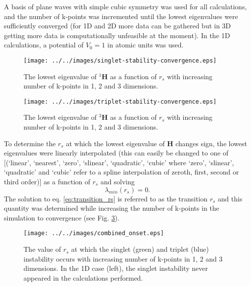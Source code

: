\documentclass[preprint, journal=prl]{revtex4-1}
\begin{document}
  A basis of plane waves with simple cubic symmetry was used for all calculations, and the number of k-points was incremented until the lowest eigenvalues were sufficiently converged {\color{red} (for 1D and 2D more data can be gathered but in 3D getting more data is computationally unfeasible at the moment)}. In the 1D calculations, a potential of $V_0 = 1$ in atomic units was used.
  \begin{figure}[H]
    \centering
    \texttt{[image: ../../images/singlet-stability-convergence.eps]}
    \caption{The lowest eigenvalue of ${}^1\mathbf{H}$ as a function of $r_s$ with increasing number of k-points in 1, 2 and 3 dimensions.}
    \label{fig:singlet_convergence}
  \end{figure}
  \begin{figure}[H]
    \centering
    \texttt{[image: ../../images/triplet-stability-convergence.eps]}
    \caption{The lowest eigenvalue of ${}^3\mathbf{H}$ as a function of $r_s$ with increasing number of k-points in 1, 2 and 3 dimensions.}
    \label{fig:triplet_convergence}
  \end{figure}
  To determine the $r_s$ at which the lowest eigenvalue of $\mathbf{H}$ changes sign, the lowest eigenvalues were linearly interpolated  {\color{red} (this can easily be changed to one of [(‘linear’, ‘nearest’, ‘zero’, ‘slinear’, ‘quadratic’, ‘cubic’ where ‘zero’, ‘slinear’, ‘quadratic’ and ‘cubic’ refer to a spline interpolation of zeroth, first, second or third order)]} as a function of $r_s$ and solving
  \begin{equation} \label{eq:transition_rs}
    \lambda_{min}(r_s) = 0.
  \end{equation}
  The solution to eq. \ref{eq:transition_rs} is referred to as the transition $r_s$ and this quantity was determined while increasing the number of k-points in the simulation to convergence (see Fig. \ref{fig:onset}).
  \begin{figure}[H]
    \centering
    \texttt{[image: ../../images/combined\_onset.eps]}
    \caption{The value of $r_s$ at which the singlet (green) and triplet (blue) instability    occurs with increasing number of k-points in 1, 2 and 3 dimensions. In the 1D case (left), the singlet instability never appeared in the calculations performed. }
    \label{fig:onset}
  \end{figure}
  
\end{document}
